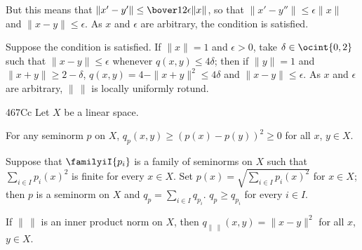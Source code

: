 {\noindent But this means that $\|x'-y'\|\le\bover12\epsilon\|x\|$, so
that $\|x'-y''\|\le\epsilon\|x\|$ and $\|x-y\|\le\epsilon$.   As $x$ and
$\epsilon$ are arbitrary, the condition is satisfied.

\medskip

 Suppose the condition is satisfied.   If $\|x\|=1$ and
$\epsilon>0$, take $\delta\in\ocint{0,2}$ such that $\|x-y\|\le\epsilon$
whenever $q(x,y)\le 4\delta$;  then if $\|y\|=1$ and
$\|x+y\|\ge 2-\delta$,
$q(x,y)=4-\|x+y\|^2\le 4\delta$ and $\|x-y\|\le\epsilon$.   As $x$ and
$\epsilon$ are arbitrary, $\|\,\|$ is locally uniformly rotund.\
\Qed}

\spheader 467Cc   Let
$X$ be a linear space.

\medskip

 For any seminorm $p$ on $X$,
$q_p(x,y)\ge(p(x)-p(y))^2\ge 0$ for all $x$,
$y\in X$.   

\medskip

  Suppose that $\familyiI{p_i}$ is a family of seminorms
on $X$ such that $\sum_{i\in I}p_i(x)^2$ is finite for every $x\in X$.
Set $p(x)=\sqrt{\sum_{i\in I}p_i(x)^2}$ for $x\in X$;  then $p$ is a
seminorm on $X$ and $q_p=\sum_{i\in I}q_{p_i}$.
   $q_p\ge q_{p_i}$ for every $i\in I$.

\medskip

 If $\|\,\|$ is an inner product norm on $X$, then
$q_{\|\,\|}(x,y)=\|x-y\|^2$ for all $x$, $y\in X$.  %

